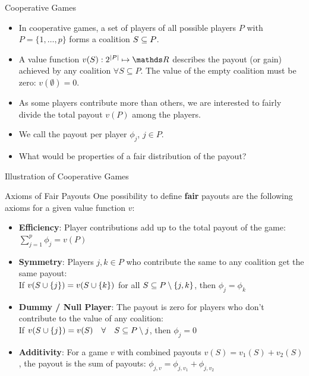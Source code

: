 \documentclass[11pt,compress,t,notes=noshow, aspectratio=169, xcolor=table]{beamer}
\begin{document}
\begin{vbframe}{Cooperative Games}
\begin{itemize}
\itemsep1em
  \item In cooperative games, a set of players of all possible players $P$ with $P = \{1, \hdots, p\}$ forms a coalition $\SsubP$.
  \item A value function $v(S): 2^{|P|}\mapsto \R$ describes the payout (or gain) achieved by any coalition $\forall S \subseteq P$. The value of the empty coalition must be zero: $v(\emptyset) = 0$.
  \item As some players contribute more than others, we are interested to fairly divide the total payout $v(P)$ among the players.
  \item We call the payout per player $\phi_j$, $j \in P$.
  \item What would be properties of a fair distribution of the payout?
\end{itemize}
\end{vbframe}

\begin{vbframe}{Illustration of Cooperative Games}



\end{vbframe}

\begin{vbframe}{Axioms of Fair Payouts}
  One possibility to define \textbf{fair} payouts are the following axioms for a given value function $v$:
  \vspace{0.25cm}
  \begin{itemize}
  \itemsep1em
    \item \textbf{Efficiency}: Player contributions add up to the total payout of the game:
      $\sum\nolimits_{j=1}^p\phi_j = v(P)$
    \item \textbf{Symmetry}: Players $j,k \in P$ who contribute the same to any coalition get the same payout: \\
      If $v(\Scupj) = v(\Scupk)$ for all $\SsubP \setminus\{j,k\}$, then $\phi_j=\phi_k$
    \item \textbf{Dummy / Null Player}: The payout is zero for players who don't contribute to the value of any coalition: \\
      If $v(\Scupj)=v(S)\quad  \forall \quad \SsubP \setminus j$, then $\phi_j=0$
    \item \textbf{Additivity}: For a game $v$ with combined payouts $v(S) = v_1(S) + v_2(S)$, the payout is the sum of payouts: $\phi_{j,v} = \phi_{j,v_1} + \phi_{j, v_2}$
  \end{itemize}
  \vspace{0.5cm}
  

\end{vbframe}
\end{document}
